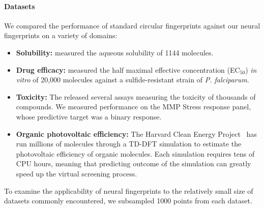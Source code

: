 \documentclass{article}
\begin{document}


\paragraph{Datasets}
We compared the performance of standard circular fingerprints against our neural fingerprints on a variety of domains:
%
\begin{itemize}
\item {\bf Solubility:} \cite{delaney_data_2004} measured the aqueous solubility of 1144 molecules.
\item{\bf Drug efficacy:} \citet{gamo2010thousands} measured the half maximal effective concentration (EC$_{50}$) {\it in vitro} of 20,000 molecules against a sulfide-resistant strain of {\it P. falciparum}.
\item {\bf Toxicity:} The \citet{tox21} released several assays measuring the toxicity of thousands of compounds.
We measured performance on the MMP Stress response panel, whose predictive target was a binary response.
\item {\bf Organic photovoltaic efficiency:} The Harvard Clean Energy Project~\citet{hachmann2011harvard} has run millions of molecules through a TD-DFT simulation to estimate the photovoltaic efficiency of organic molecules.
Each simulation requires tens of CPU hours, meaning that predicting outcome of the simulation can greatly speed up the virtual screening process.
\end{itemize}
%
To examine the applicability of neural fingerprints to the relatively small size of datasets commonly encountered, we subsampled 1000 points from each dataset.
\end{document}
